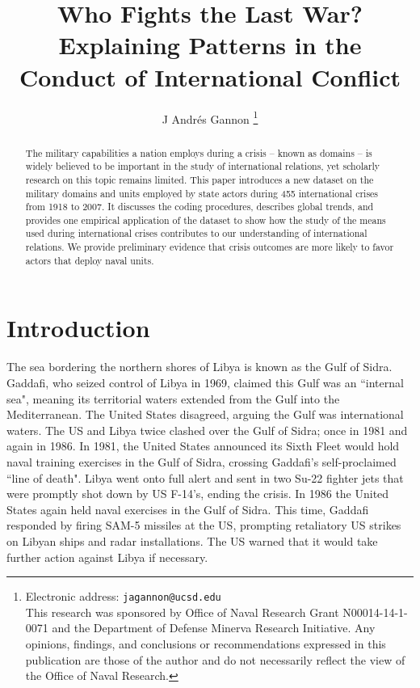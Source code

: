 \documentclass[12pt,letterpaper]{article}
\title{Who Fights the Last War? Explaining Patterns in the Conduct of International Conflict}
\author{J Andr\'{e}s Gannon%
	\thanks{Electronic address: \texttt{jagannon@ucsd.edu} \\ This research was sponsored by Office of Naval Research Grant N00014-14-1-0071 and the Department of Defense Minerva Research Initiative. Any opinions, findings, and conclusions or recommendations expressed in this publication are those of the author and do not necessarily reflect the view of the Office of Naval Research.}}
\affil{Department of Political Science \\ University of California, San Diego}
\begin{document}
\maketitle
	
\begin{abstract}
The military capabilities a nation employs during a crisis -- known as domains -- is widely believed to be important in the study of international relations, yet scholarly research on this topic remains limited. This paper introduces a new dataset on the military domains and units employed by state actors during 455 international crises from 1918 to 2007. It discusses the coding procedures, describes global trends, and provides one empirical application of the dataset to show how the study of the means used during international crises contributes to our understanding of international relations. We provide preliminary evidence that crisis outcomes are more likely to favor actors that deploy naval units.
\end{abstract}

\section{Introduction}
	The sea bordering the northern shores of Libya is known as the Gulf of Sidra. Gaddafi, who seized control of Libya in 1969, claimed this Gulf was an ``internal sea", meaning its territorial waters extended from the Gulf into the Mediterranean. The United States disagreed, arguing the Gulf was international waters. The US and Libya twice clashed over the Gulf of Sidra; once in 1981 and again in 1986. In 1981, the United States announced its Sixth Fleet would hold naval training exercises in the Gulf of Sidra, crossing Gaddafi's self-proclaimed ``line of death". Libya went onto full alert and sent in two Su-22 fighter jets that were promptly shot down by US F-14's, ending the crisis. In 1986 the United States again held naval exercises in the Gulf of Sidra. This time, Gaddafi responded by firing SAM-5 missiles at the US, prompting retaliatory US strikes on Libyan ships and radar installations. The US warned that it would take further action against Libya if necessary.
	
\end{document}
